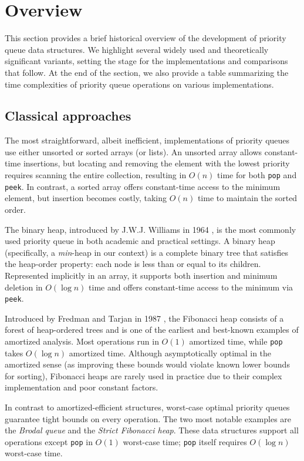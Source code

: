 \section{Overview}

This section provides a brief historical overview of the development of priority queue data structures. We highlight several widely used and theoretically significant variants, setting the stage for the implementations and comparisons that follow. At the end of the section, we also provide a table summarizing the time complexities of priority queue operations on various implementations.

\subsection{Classical approaches}

The most straightforward, albeit inefficient, implementations of priority queues use either unsorted or sorted arrays (or lists). An unsorted array allows constant-time insertions, but locating and removing the element with the lowest priority requires scanning the entire collection, resulting in \(O(n)\) time for both \texttt{pop} and \texttt{peek}. In contrast, a sorted array offers constant-time access to the minimum element, but insertion becomes costly, taking \(O(n)\) time to maintain the sorted order.

The binary heap, introduced by J.W.J. Williams in 1964 \cite{williams1964heapsort}, is the most commonly used priority queue in both academic and practical settings. A binary heap (specifically, a \emph{min}-heap in our context) is a complete binary tree that satisfies the heap-order property: each node is less than or equal to its children. Represented implicitly in an array, it supports both insertion and minimum deletion in \(O(\log n)\) time and offers constant-time access to the minimum via \texttt{peek}.

Introduced by Fredman and Tarjan in 1987 \cite{fredman1987fibonacci}, the Fibonacci heap consists of a forest of heap-ordered trees and is one of the earliest and best-known examples of amortized analysis. Most operations run in \(O(1)\) amortized time, while \texttt{pop} takes \(O(\log n)\) amortized time. Although asymptotically optimal in the amortized sense (as improving these bounds would violate known lower bounds for sorting), Fibonacci heaps are rarely used in practice due to their complex implementation and poor constant factors.

In contrast to amortized-efficient structures, worst-case optimal priority queues guarantee tight bounds on every operation. The two most notable examples are the \emph{Brodal queue} and the \emph{Strict Fibonacci heap}. These data structures support all operations except \texttt{pop} in \(O(1)\) worst-case time; \texttt{pop} itself requires \(O(\log n)\) worst-case time.

